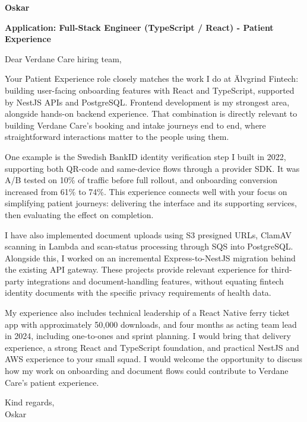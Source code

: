 \documentclass[11pt,a4paper]{article}
\begin{document}
{\Large\bfseries\color{primarycolor} Oskar}

\textbf{Application: Full-Stack Engineer (TypeScript / React) - Patient Experience}

Dear Verdane Care hiring team,

Your Patient Experience role closely matches the work I do at Älvgrind Fintech: building user-facing onboarding features with React and TypeScript, supported by NestJS APIs and PostgreSQL. Frontend development is my strongest area, alongside hands-on backend experience. That combination is directly relevant to building Verdane Care's booking and intake journeys end to end, where straightforward interactions matter to the people using them.

One example is the Swedish BankID identity verification step I built in 2022, supporting both QR-code and same-device flows through a provider SDK. It was A/B tested on 10\% of traffic before full rollout, and onboarding conversion increased from 61\% to 74\%. This experience connects well with your focus on simplifying patient journeys: delivering the interface and its supporting services, then evaluating the effect on completion.

I have also implemented document uploads using S3 presigned URLs, ClamAV scanning in Lambda and scan-status processing through SQS into PostgreSQL. Alongside this, I worked on an incremental Express-to-NestJS migration behind the existing API gateway. These projects provide relevant experience for third-party integrations and document-handling features, without equating fintech identity documents with the specific privacy requirements of health data.

My experience also includes technical leadership of a React Native ferry ticket app with approximately 50,000 downloads, and four months as acting team lead in 2024, including one-to-ones and sprint planning. I would bring that delivery experience, a strong React and TypeScript foundation, and practical NestJS and AWS experience to your small squad. I would welcome the opportunity to discuss how my work on onboarding and document flows could contribute to Verdane Care's patient experience.

Kind regards,\\
Oskar
\end{document}
